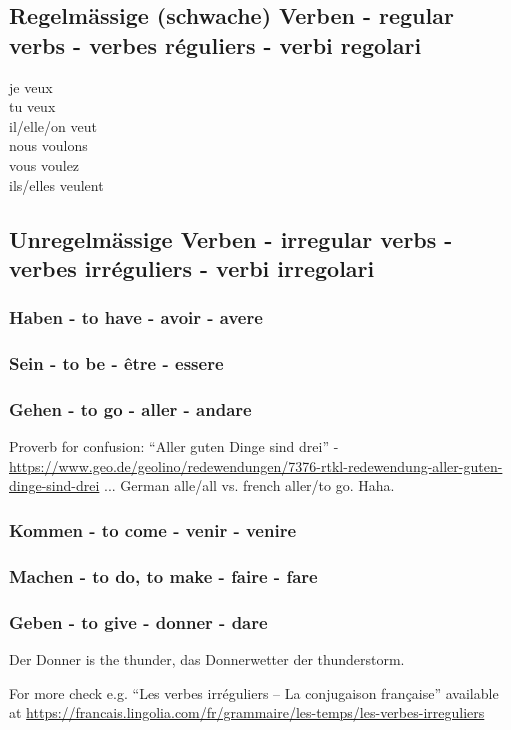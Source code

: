 \subsection{Regelmässige (schwache) Verben - regular verbs - verbes réguliers - verbi regolari}
je veux \\
tu veux \\
il/elle/on veut \\
nous voulons \\
vous voulez \\
ils/elles veulent \\


\subsection{Unregelmässige Verben - irregular verbs - verbes irréguliers - verbi irregolari}

\subsubsection{Haben - to have - avoir - avere}

\subsubsection{Sein - to be - être - essere}

\subsubsection{Gehen - to go - aller - andare}
Proverb for confusion:  ``Aller guten Dinge sind drei'' - \url{https://www.geo.de/geolino/redewendungen/7376-rtkl-redewendung-aller-guten-dinge-sind-drei} ... German alle/all vs. french aller/to go. Haha.

\subsubsection{Kommen - to come - venir - venire}

\subsubsection{Machen - to do, to make - faire - fare}

\subsubsection{Geben - to give - donner - dare}
 Der Donner is  the thunder, das  Donnerwetter der  thunderstorm.

For more check e.g. ``Les verbes irréguliers – La conjugaison française'' available at
\url{https://francais.lingolia.com/fr/grammaire/les-temps/les-verbes-irreguliers}
